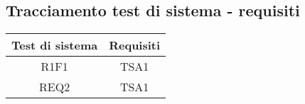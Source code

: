 \subsection{Tracciamento test di sistema - requisiti}

\begin{center}
	\begin{longtable}{|c|c|}
	\hline
	\rowcolor{lighter-grayer}
	\textbf{Test di sistema} & \textbf{Requisiti} \\
	\hline
	\endfirsthead


	
	\hline
	R1F1 & TSA1  \\
	REQ2 & TSA1 \\

	\hline

	\end{longtable}
\end{center}


